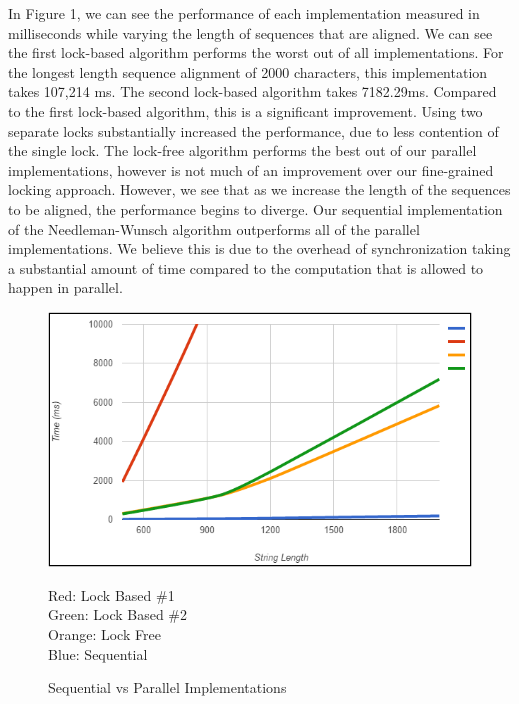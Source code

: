 \documentclass[letterpaper, 10 pt, conference]{IEEEconf}
\begin{document}
In Figure 1, we can see the performance of each implementation measured in milliseconds while varying the length of sequences that are aligned. We can see the first lock-based algorithm performs the worst out of all implementations. For the longest length sequence alignment of 2000 characters, this implementation takes 107,214 ms. The second lock-based algorithm takes 7182.29ms. Compared to the first lock-based algorithm, this is a significant improvement. Using two separate locks substantially increased the performance, due to less contention of the single lock. The lock-free algorithm performs the best out of our parallel implementations, however is not much of an improvement over our fine-grained locking approach. However, we see that as we increase the length of the sequences to be aligned, the performance begins to diverge. Our sequential implementation of the Needleman-Wunsch algorithm outperforms all of the parallel implementations. We believe this is due to the overhead of synchronization taking a substantial amount of time compared to the computation that is allowed to happen in parallel. 

\begin{figure}
\centering
\includegraphics[scale=0.6]{sequential_vs_parallel}
\caption{Sequential vs Parallel Implementations}
\medskip
\small
Red: Lock Based \#1\\ Green: Lock Based \#2\\ Orange: Lock Free\\ Blue: Sequential    
\end{figure}
\end{document}
